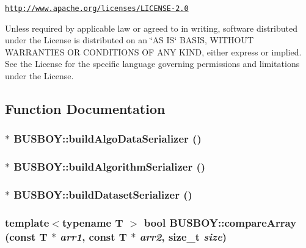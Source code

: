 \href{http://www.apache.org/licenses/LICENSE-2.0}{\tt http://www.apache.org/licenses/LICENSE-\/2.0}

Unless required by applicable law or agreed to in writing, software distributed under the License is distributed on an \char`\"{}AS IS\char`\"{} BASIS, WITHOUT WARRANTIES OR CONDITIONS OF ANY KIND, either express or implied. See the License for the specific language governing permissions and limitations under the License. 

\subsection{Function Documentation}
\hypertarget{namespaceBUSBOY_abe28e9b3e829acb3638a78f75cecf91c}{
\subsubsection[{buildAlgoDataSerializer}]{$\ast$ BUSBOY::buildAlgoDataSerializer ()}}
\label{namespaceBUSBOY_abe28e9b3e829acb3638a78f75cecf91c}
\hypertarget{namespaceBUSBOY_a13b558c3160921511fc5451948a411a0}{
\subsubsection[{buildAlgorithmSerializer}]{$\ast$ BUSBOY::buildAlgorithmSerializer ()}}
\label{namespaceBUSBOY_a13b558c3160921511fc5451948a411a0}
\hypertarget{namespaceBUSBOY_aae13194f46d8e019992b0f869869ff59}{
\subsubsection[{buildDatasetSerializer}]{$\ast$ BUSBOY::buildDatasetSerializer ()}}
\label{namespaceBUSBOY_aae13194f46d8e019992b0f869869ff59}
\hypertarget{namespaceBUSBOY_afab314ffc342c103654ef4cf843d8e1f}{
\subsubsection[{compareArray}]{\setlength{\rightskip}{0pt plus 5cm}template$<$typename T $>$ bool BUSBOY::compareArray (const T $\ast$ {\em arr1}, \/  const T $\ast$ {\em arr2}, \/  size\_\-t {\em size})}}
\label{namespaceBUSBOY_afab314ffc342c103654ef4cf843d8e1f}


